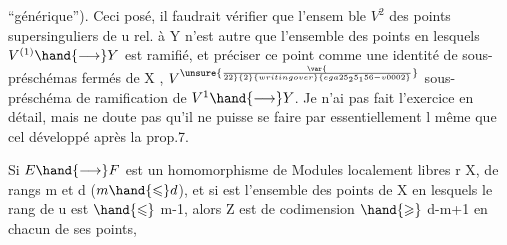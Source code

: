 
 ``générique'').   Ceci posé, il faudrait vérifier que l'ensem ble $V^2$
des points supersinguliers de u rel. à Y n'est autre que l'ensemble des
points en lesquels $V^{(1)} \hand{\longrightarrow} Y$ est ramifié, et préciser ce point
comme une identité de sous-préschémas fermés de X , $V^{\unsure{\var{\over{2}{2}}{2}{writing over}{ega25_25_156-v0002}}}$  sous-préschéma
de ramification de $V^1 \hand{\longrightarrow} Y$. Je n'ai pas fait l'exercice en détail,
mais ne doute pas qu'il ne puisse se faire par essentiellement l même
  que cel développé après la prop.7.

 Si $E \hand{\longrightarrow} F$ est un homomorphisme de Modules localement libres r 
X, de rangs m et d ($m \hand{\leqslant} d$), et si  est l'ensemble des points de X en
lesquels le rang de u est $\hand{\leqslant}$ m-1, alors  Z est de codimension $\hand{\geqslant}$ d-m+1
en chacun de ses points, 

